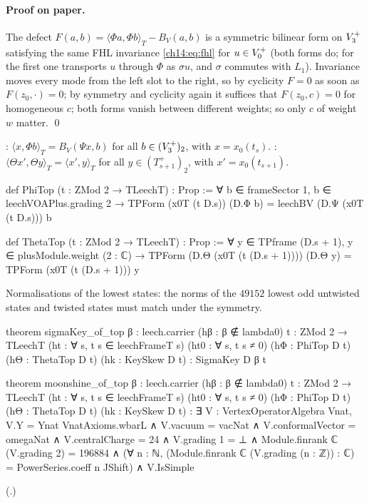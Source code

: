\paragraph{Proof on paper.}  The defect $F(a,b)=\langle\Phi a,\Phi b\rangle_T-B_V(a,b)$ is a symmetric
bilinear form on $V_3^{+}$ satisfying the same FHL invariance \eqref{ch14:eq:fhl} for $u\in V_0^{+}$ (both
forms do; for the first one transports $u$ through $\Phi$ as $\sigma u$, and $\sigma$ commutes with
$L_1$).  Invariance moves every mode from the left slot to the right, so by cyclicity $F=0$ as soon as
$F(z_0,\cdot)=0$; by symmetry and cyclicity again it suffices that $F(z_0,c)=0$ for homogeneous $c$;
both forms vanish between different weights; so only $c$ of weight $w$ matter. \qed

\begin{definition}\label{ch14:def:phitop}
: $\langle x,\Phi b\rangle_T=B_V(\Psi x,b)$ for all $b\in(V_3^{+})_2$, with $x=x_0(t_s)$.
: $\langle\Theta x',\Theta y\rangle_T=\langle x',y\rangle_T$ for all $y\in(T_{s+1}^+)_2$, with
$x'=x_0(t_{s+1})$.
\end{definition}
\begin{leancode}
def PhiTop (t : ZMod 2 → TLeechT) : Prop :=
  ∀ b ∈ frameSector 1, b ∈ leechVOAPlus.grading 2 →
    TPForm (x0T (t D.s)) (D.Φ b) = leechBV (D.Ψ (x0T (t D.s))) b

def ThetaTop (t : ZMod 2 → TLeechT) : Prop :=
  ∀ y ∈ TPframe (D.s + 1), y ∈ plusModule.weight (2 : ℂ) →
    TPForm (D.Θ (x0T (t (D.s + 1)))) (D.Θ y) = TPForm (x0T (t (D.s + 1))) y
\end{leancode}
\begin{physics}
Normalisations of the lowest states: the norms of the $49152$ lowest odd untwisted states and twisted states must match under the symmetry.
\end{physics}


\begin{theorem}\label{ch14:thm:top}
\begin{leancode}
theorem sigmaKey_of_top {β : leech.carrier} (hβ : β ∉ lambda0) {t : ZMod 2 → TLeechT}
    (ht : ∀ s, t s ∈ leechFrameT s) (ht0 : ∀ s, t s ≠ 0)
    (hΦ : PhiTop D t) (hΘ : ThetaTop D t) (hk : KeySkew D t) : SigmaKey D β t

theorem moonshine_of_top {β : leech.carrier} (hβ : β ∉ lambda0) {t : ZMod 2 → TLeechT}
    (ht : ∀ s, t s ∈ leechFrameT s) (ht0 : ∀ s, t s ≠ 0)
    (hΦ : PhiTop D t) (hΘ : ThetaTop D t) (hk : KeySkew D t) :
    ∃ V : VertexOperatorAlgebra Vnat,
      V.Y = Ynat VnatAxioms.wbarL ∧ V.vacuum = vacNat ∧ V.conformalVector = omegaNat ∧
      V.centralCharge = 24 ∧
      V.grading 1 = ⊥ ∧
      Module.finrank ℂ (V.grading 2) = 196884 ∧
      (∀ n : ℕ, (Module.finrank ℂ (V.grading (n : ℤ)) : ℂ) = PowerSeries.coeff n JShift) ∧
      V.IsSimple
\end{leancode}
\end{theorem}
(.)

